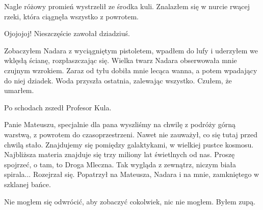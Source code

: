 Nagle różowy promień wystrzelił ze środka kuli.
Znalazłem się w nurcie rwącej rzeki, która ciągnęła wszystko z powrotem.
\begin{dialogue}
\ds{} Ojojojoj! Nieszczęście \dm{} zawołał dziadziuś.
\end{dialogue}
Zobaczyłem Nadara z wyciągniętym pistoletem, wpadłem do lufy i uderzyłem we wklęsłą ścianę, rozpłaszczając się.
Wielka twarz Nadara obserwowała mnie czujnym wzrokiem.
Zaraz od tyłu dobiła mnie lecąca wanna, a potem wpadający do niej dziadek.
Woda przyszła ostatnia, zalewając wszystko.
Czułem, że umarłem.

Po schodach zszedł Profesor Kula.
\begin{dialogue}
\ds{} Panie Mateuszu, specjalnie dla pana wyszliśmy na chwilę z podróży górną warstwą, z powrotem do czasoprzestrzeni. \dm{} Nawet nie zauważył, co się tutaj przed chwilą stało.
\dm{} Znajdujemy się pomiędzy galaktykami,  w wielkiej pustce kosmosu. Najbliższa materia znajduje się trzy miliony lat świetlnych od nas. Proszę spojrzeć, 
o tam, to Droga Mleczna. Tak wygląda z zewnątrz, niczym biała spirala... \dm{} Rozejrzał się. Popatrzył na Mateusza, Nadara i na mnie, zamkniętego w szklanej bańce.
\end{dialogue}
Nie mogłem się odwrócić, aby zobaczyć cokolwiek, nic nie mogłem. Byłem zupą.

